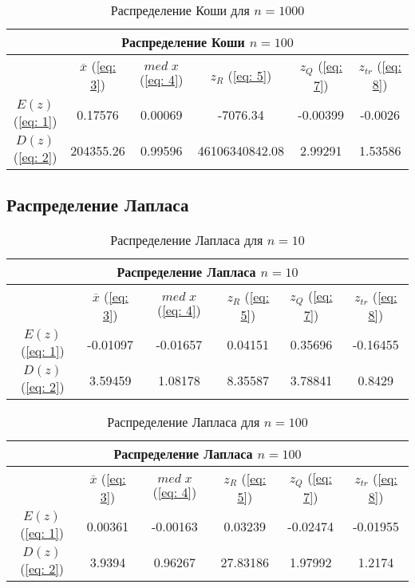 \documentclass{article}
\begin{document}
\begin{table}[hb]
\begin{center}
\begin{tabular}{|c|c|c|c|c|c|}
\hline 
\multicolumn{6}{|c|}{Распределение Коши $n=100$} \\ 
\hline 
  & $\overline{x}$ (\ref{eq: 3}) & $med \; x$ (\ref{eq: 4}) & $z_R$ (\ref{eq: 5}) & $z_Q$ (\ref{eq: 7}) & $z_{tr}$ (\ref{eq: 8}) \\ 
\hline 
$E(z)$ (\ref{eq: 1}) & 0.17576 & 0.00069 & -7076.34 & -0.00399 & -0.0026 \\ 
\hline 
$D(z)$ (\ref{eq: 2}) & 204355.26 & 0.99596 & 46106340842.08 & 2.99291 & 1.53586 \\ 
\hline 
\end{tabular} 
\caption{Распределение Коши для $n=1000$}
\end{center}
\end{table}

\newpage
\subsection{Распределение Лапласа}

\begin{table}[hb]
\begin{center}
\begin{tabular}{|c|c|c|c|c|c|}
\hline 
\multicolumn{6}{|c|}{Распределение Лапласа $n=10$} \\ 
\hline 
  & $\overline{x}$ (\ref{eq: 3}) & $med \; x$ (\ref{eq: 4}) & $z_R$ (\ref{eq: 5}) & $z_Q$ (\ref{eq: 7}) & $z_{tr}$ (\ref{eq: 8}) \\ 
\hline 
$E(z)$ (\ref{eq: 1}) & -0.01097 & -0.01657 & 0.04151 & 0.35696 & -0.16455 \\ 
\hline 
$D(z)$ (\ref{eq: 2}) & 3.59459 & 1.08178 & 8.35587 & 3.78841 & 0.8429 \\ 
\hline 
\end{tabular} 
\caption{Распределение Лапласа для $n=10$}
\end{center}
\end{table}

\begin{table}[hb]
\begin{center}
\begin{tabular}{|c|c|c|c|c|c|}
\hline 
\multicolumn{6}{|c|}{Распределение Лапласа $n=100$} \\ 
\hline 
  & $\overline{x}$ (\ref{eq: 3}) & $med \; x$ (\ref{eq: 4}) & $z_R$ (\ref{eq: 5}) & $z_Q$ (\ref{eq: 7}) & $z_{tr}$ (\ref{eq: 8}) \\ 
\hline 
$E(z)$ (\ref{eq: 1}) & 0.00361 & -0.00163 & 0.03239 & -0.02474 & -0.01955 \\ 
\hline 
$D(z)$ (\ref{eq: 2}) & 3.9394 & 0.96267 & 27.83186 & 1.97992 & 1.2174 \\ 
\hline 
\end{tabular} 
\caption{Распределение Лапласа для $n=100$}
\end{center}
\end{table}
\end{document}

